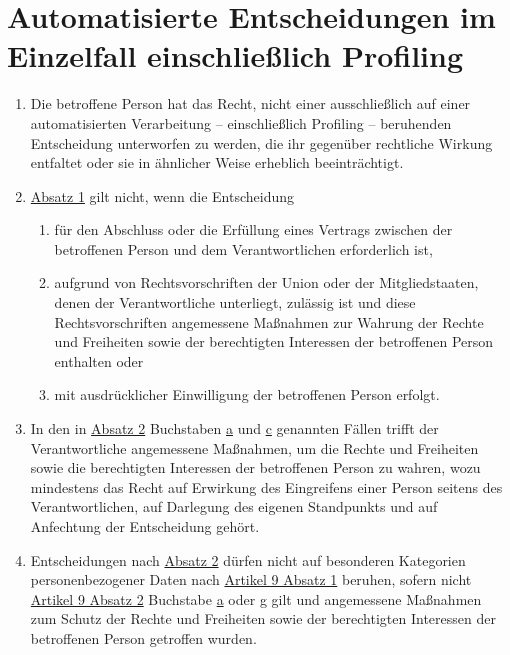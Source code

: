\chapter{Automatisierte Entscheidungen im Einzelfall einschließlich Profiling}
\label{ch:22}


\begin{enumerate}

  \item Die betroffene Person hat das Recht, nicht einer ausschließlich auf einer automatisierten Verarbeitung --
   einschließlich Profiling -- beruhenden Entscheidung unterworfen zu werden, die ihr gegenüber rechtliche Wirkung
   entfaltet oder sie in ähnlicher Weise erheblich beeinträchtigt.
  \label{itm:22-1}

  \item \hyperref[itm:22-1]{Absatz 1} gilt nicht, wenn die Entscheidung
  \label{itm:22-2}

  \begin{enumerate}
  
    \item für den Abschluss oder die Erfüllung eines Vertrags zwischen der betroffenen Person und dem Verantwortlichen
     erforderlich ist,
    \label{itm:22-2a}

    \item aufgrund von Rechtsvorschriften der Union oder der Mitgliedstaaten, denen der Verantwortliche unterliegt,
     zulässig ist und diese Rechtsvorschriften angemessene Maßnahmen zur Wahrung der Rechte und Freiheiten sowie der
     berechtigten Interessen der betroffenen Person enthalten oder
    \label{itm:22-2b}

    \item mit ausdrücklicher Einwilligung der betroffenen Person erfolgt.
    \label{itm:22-2c}

  \end{enumerate}

  \item In den in \hyperref[itm:22-2]{Absatz 2} Buchstaben \hyperref[itm:22-2a]{a} und \hyperref[itm:22-2c]{c} genannten
   Fällen trifft der Verantwortliche angemessene Maßnahmen, um die Rechte und Freiheiten sowie die berechtigten
   Interessen der betroffenen Person zu wahren, wozu mindestens das Recht auf Erwirkung des Eingreifens einer Person
   seitens des Verantwortlichen, auf Darlegung des eigenen Standpunkts und auf Anfechtung der Entscheidung gehört.
  \label{itm:22-3}

  \item Entscheidungen nach \hyperref[itm:22-2]{Absatz 2} dürfen nicht auf besonderen Kategorien personenbezogener Daten
  nach \hyperref[itm:09-1]{Artikel 9 Absatz 1} beruhen, sofern nicht \hyperref[itm:09-2]{Artikel 9 Absatz 2} Buchstabe
  \hyperref[itm:09-2a]{a} oder \hyperref[itm:09-2g]{g} gilt und angemessene Maßnahmen zum Schutz der Rechte und
   Freiheiten sowie der berechtigten Interessen der betroffenen Person getroffen wurden.
  \label{itm:22-4}

\end{enumerate}


